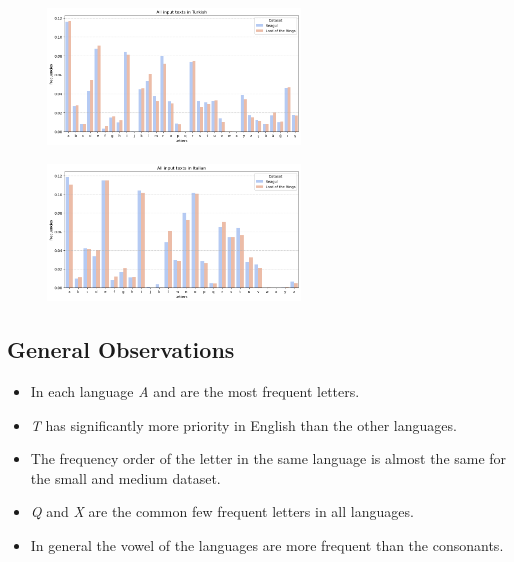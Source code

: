 \begin{figure}[h]
    \centering
    \includegraphics[width=0.6\textwidth]{media/allTurkish.png}
\end{figure}

\begin{figure}[h]
    \centering
    \includegraphics[width=0.6\textwidth]{media/allItalian.png}
\end{figure}


\subsection{General Observations}

\begin{itemize}
    \item In each language \textit{A} and  are the most frequent letters.
    \item \textit{T} has significantly more priority in English than the other languages.
    \item The frequency order of the letter in the same language is almost the same for the small and medium dataset.
    \item \textit{Q} and \textit{X} are the common few frequent letters in all languages.
    \item In general the vowel of the languages are more frequent than the consonants.
\end{itemize}